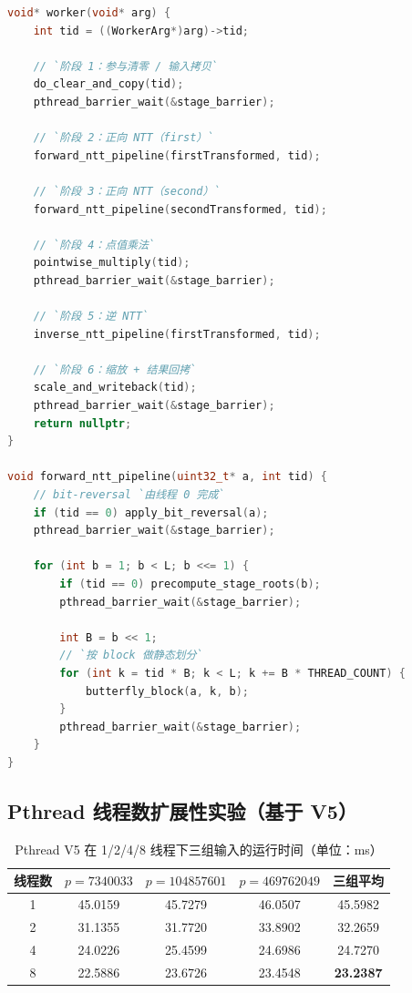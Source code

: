 \documentclass[UTF8,a4paper,10pt]{ctexart}
\begin{document}
\begin{lstlisting}[title=Pthread whole-pipeline 线程函数主体（简化）,frame=trbl,language={C++}]
void* worker(void* arg) {
    int tid = ((WorkerArg*)arg)->tid;

    // `阶段 1：参与清零 / 输入拷贝`
    do_clear_and_copy(tid);
    pthread_barrier_wait(&stage_barrier);

    // `阶段 2：正向 NTT（first）`
    forward_ntt_pipeline(firstTransformed, tid);

    // `阶段 3：正向 NTT（second）`
    forward_ntt_pipeline(secondTransformed, tid);

    // `阶段 4：点值乘法`
    pointwise_multiply(tid);
    pthread_barrier_wait(&stage_barrier);

    // `阶段 5：逆 NTT`
    inverse_ntt_pipeline(firstTransformed, tid);

    // `阶段 6：缩放 + 结果回拷`
    scale_and_writeback(tid);
    pthread_barrier_wait(&stage_barrier);
    return nullptr;
}

void forward_ntt_pipeline(uint32_t* a, int tid) {
    // bit-reversal `由线程 0 完成`
    if (tid == 0) apply_bit_reversal(a);
    pthread_barrier_wait(&stage_barrier);

    for (int b = 1; b < L; b <<= 1) {
        if (tid == 0) precompute_stage_roots(b);
        pthread_barrier_wait(&stage_barrier);

        int B = b << 1;
        // `按 block 做静态划分`
        for (int k = tid * B; k < L; k += B * THREAD_COUNT) {
            butterfly_block(a, k, b);
        }
        pthread_barrier_wait(&stage_barrier);
    }
}
\end{lstlisting}

\subsection{Pthread 线程数扩展性实验（基于 V5）}

\begin{table}[H]
  \centering
  \begin{tabular}{ccccc}
  \toprule  
  \textbf{线程数} & $p=7340033$ & $p=104857601$ & $p=469762049$ & \textbf{三组平均}\\
  \midrule
  1 & 45.0159 & 45.7279 & 46.0507 & 45.5982 \\
  2 & 31.1355 & 31.7720 & 33.8902 & 32.2659 \\
  4 & 24.0226 & 25.4599 & 24.6986 & 24.7270 \\
  8 & 22.5886 & 23.6726 & 23.4548 & \textbf{23.2387} \\
  \bottomrule
  \end{tabular}
  \caption{Pthread V5 在 1/2/4/8 线程下三组输入的运行时间（单位：ms）}
  \label{tab:pthread-scale}
\end{table}
\end{document}
